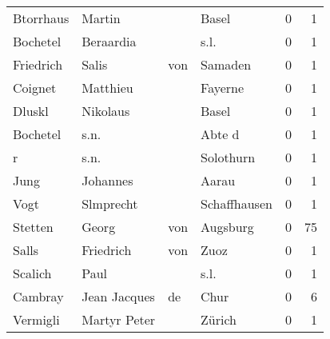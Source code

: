 \begin{tabular}{llllrr}
                Btorrhaus &                             Martin &             &                                       Basel &          0 &         1 \\
                 Bochetel &                          Beraardia &             &                                        s.l. &          0 &         1 \\
                Friedrich &                              Salis &         von &                                     Samaden &          0 &         1 \\
                  Coignet &                           Matthieu &             &                                     Fayerne &          0 &         1 \\
                   Dluskl &                           Nikolaus &             &                                       Basel &          0 &         1 \\
                 Bochetel &                               s.n. &             &                                      Abte d &          0 &         1 \\
                        r &                               s.n. &             &                                   Solothurn &          0 &         1 \\
                     Jung &                           Johannes &             &                                       Aarau &          0 &         1 \\
                     Vogt &                          Slmprecht &             &                                Schaffhausen &          0 &         1 \\
                  Stetten &                              Georg &         von &                                    Augsburg &          0 &        75 \\
                    Salls &                          Friedrich &         von &                                        Zuoz &          0 &         1 \\
                  Scalich &                               Paul &             &                                        s.l. &          0 &         1 \\
                  Cambray &                       Jean Jacques &          de &                                        Chur &          0 &         6 \\
                 Vermigli &                       Martyr Peter &             &                                      Zürich &          0 &         1 \\

\end{tabular}

